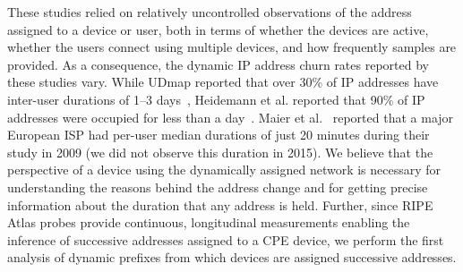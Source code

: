 These studies relied on relatively uncontrolled observations of
the address assigned to a device or user, both in terms of whether
the devices are active, whether the users connect using multiple devices,
and how frequently samples are provided.  As a consequence, 
the dynamic IP address churn rates reported by these studies
vary.  While UDmap reported that over 30\% of IP addresses have
inter-user durations of 1--3 days~\cite{udmap},  Heidemann et
al. reported that 90\% of IP addresses were occupied for less than a
day~\cite{census-survey}.  Maier et al.~\cite{maier2009dominant} reported that a
major European ISP had per-user median durations of just 20 minutes during
their study in 2009 (we did not observe this duration in 2015).
We believe that the perspective of a device using the dynamically assigned
network is necessary for understanding the reasons behind the address change
and for getting precise information about the duration that any
address is held. Further, since RIPE Atlas probes provide continuous,
longitudinal measurements enabling the inference of successive
addresses assigned to a CPE device, we perform the first
analysis of dynamic prefixes from which devices are assigned
successive addresses.

